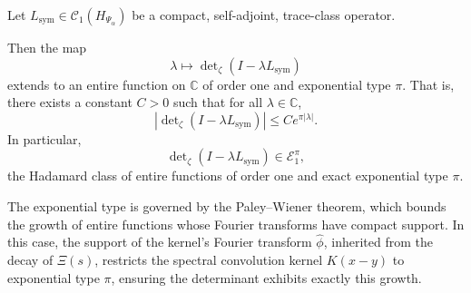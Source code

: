 \begin{lemma}
\label{lem:det_identity_entire_order_one}
Let \( L_{\mathrm{sym}} \in \mathcal{C}_1(H_{\Psi_\alpha}) \) be a compact, self-adjoint, trace-class operator.

Then the map
\[
\lambda \mapsto \det\nolimits_\zeta(I - \lambda L_{\mathrm{sym}})
\]
extends to an entire function on \( \mathbb{C} \) of order one and exponential type \( \pi \). That is, there exists a constant \( C > 0 \) such that for all \( \lambda \in \mathbb{C} \),
\[
\left| \det\nolimits_\zeta(I - \lambda L_{\mathrm{sym}}) \right| \le C e^{\pi |\lambda|}.
\]
In particular,
\[
\det\nolimits_\zeta(I - \lambda L_{\mathrm{sym}}) \in \mathcal{E}_1^\pi,
\]
the Hadamard class of entire functions of order one and exact exponential type \( \pi \).

\medskip
\noindent
The exponential type is governed by the Paley–Wiener theorem, which bounds the growth of entire functions whose Fourier transforms have compact support. In this case, the support of the kernel’s Fourier transform \( \widehat{\phi} \), inherited from the decay of \( \Xi(s) \), restricts the spectral convolution kernel \( K(x-y) \) to exponential type \( \pi \), ensuring the determinant exhibits exactly this growth.
\end{lemma}
% 